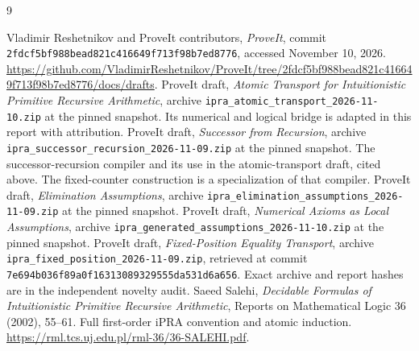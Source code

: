 \documentclass[11pt,letterpaper]{article}
\theoremstyle{definition}\newtheorem{definition}[theorem]{Definition}
\theoremstyle{remark}\newtheorem{remark}[theorem]{Remark}
\newcommand{\file}[1]{{\small\nolinkurl{#1}}}
\begin{document}
\begin{thebibliography}{9}
\raggedright
{} Vladimir Reshetnikov and ProveIt contributors,
\emph{ProveIt}, commit
\file{2fdcf5bf988bead821c416649f713f98b7ed8776}, accessed November 10, 2026.
\url{https://github.com/VladimirReshetnikov/ProveIt/tree/2fdcf5bf988bead821c416649f713f98b7ed8776/docs/drafts}.
 ProveIt draft, \emph{Atomic Transport for Intuitionistic
Primitive Recursive Arithmetic}, archive
\file{ipra_atomic_transport_2026-11-10.zip} at the pinned snapshot.
Its numerical and logical bridge is adapted in this report with attribution.
 ProveIt draft, \emph{Successor from Recursion},
archive \file{ipra_successor_recursion_2026-11-09.zip} at the pinned snapshot.
 The successor-recursion compiler and its use in the
atomic-transport draft, cited above. The fixed-counter construction is
a specialization of that compiler.
 ProveIt draft, \emph{Elimination Assumptions},
archive \file{ipra_elimination_assumptions_2026-11-09.zip} at the pinned snapshot.
 ProveIt draft, \emph{Numerical Axioms as Local Assumptions},
archive \file{ipra_generated_assumptions_2026-11-10.zip} at the pinned snapshot.
 ProveIt draft, \emph{Fixed-Position Equality Transport},
archive \file{ipra_fixed_position_2026-11-09.zip}, retrieved at commit
\file{7e694b036f89a0f16313089329555da531d6a656}.
Exact archive and report hashes are in the independent novelty audit.
 Saeed Salehi, \emph{Decidable Formulas of Intuitionistic
Primitive Recursive Arithmetic}, Reports on Mathematical Logic 36
(2002), 55--61. Full first-order iPRA convention and atomic induction.
\url{https://rml.tcs.uj.edu.pl/rml-36/36-SALEHI.pdf}.
\end{thebibliography}
\end{document}

